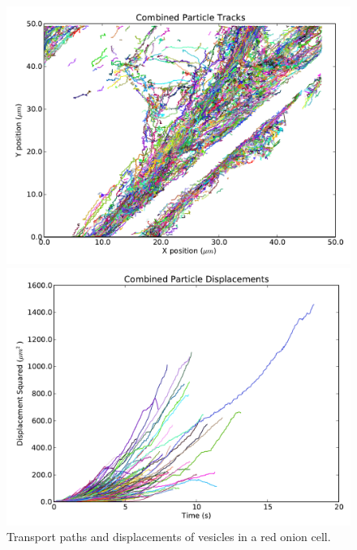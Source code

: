 \documentclass[11pt,letterpaper]{article}
\begin{document}
\begin{figure}
    \centering
    \begin{minipage}[t]{0.485\textwidth}
        \centering
        \includegraphics[width=\textwidth]{figures/red_onion_test_17_tracks.pdf}
    \end{minipage}
    \begin{minipage}[t]{0.485\textwidth}
        \centering
        \includegraphics[width=\textwidth]{figures/red_onion_test_17_dispsq.pdf}
    \end{minipage}
    \caption{Transport paths and displacements of vesicles in a red onion cell.}
    \label{onion_tracks}
\end{figure}
\end{document}
